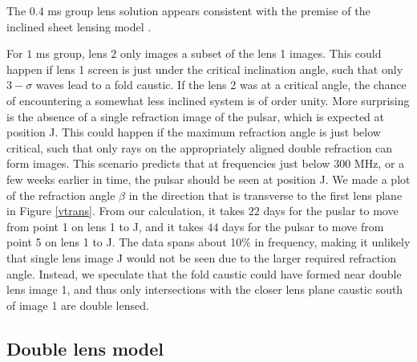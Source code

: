 \documentclass[useAMS,usenatbib]{mn2e}
\begin{document}
The $0.4$ ms group lens solution appears consistent with the premise of the inclined
sheet lensing model \citep{2014MNRAS.442.3338P}.

For $1$ ms group, lens 2
only images a subset of the lens 1 images.  This could happen if
lens 1 screen is just under the critical inclination
angle, such that only $3-\sigma$ waves lead to a fold caustic.  If the lens 2 was at a critical angle, the chance of encountering a
somewhat less inclined system is of order unity.
More surprising is the absence of a single refraction
image of the pulsar, which is expected at position J.  This could
happen if the maximum refraction angle is just below critical, such
that only rays on the appropriately aligned double refraction can form
images.  This scenario predicts that at frequencies just below $300$
MHz, or a few weeks earlier in time, the pulsar should be seen at
position J. We made a plot of the refraction angle $\beta$ in the
direction that is transverse to the first lens plane in Figure
\ref{vtrans}.  From our calculation, it takes $22$ days for the puslar
to move from point 1 on lens 1 to J, and it takes $44$ days
for the pulsar to move from point 5 on lens 1 to J.  The data
spans about 10\% in frequency, making it unlikely that single lens
image J would not be seen due to the larger required refraction
angle.  Instead, we speculate that the fold caustic could have formed
near double lens image 1, and thus only intersections with the closer
lens plane caustic south of image 1 are double lensed.

\subsection{Double lens model}
\label{doublelensmodel}
\end{document}
